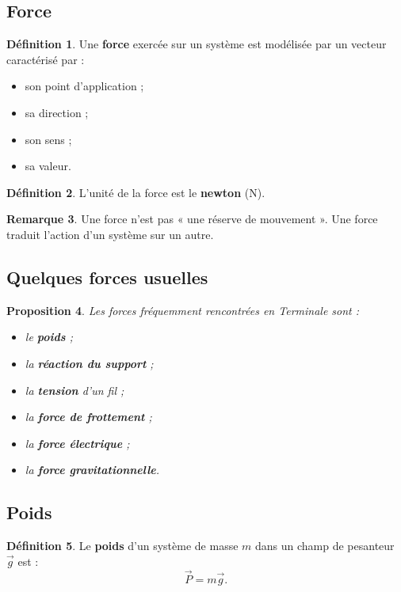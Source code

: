 \documentclass[11pt,a4paper]{article}
\theoremstyle{definition}
\newtheorem{definition}{Définition}[section]
\newtheorem{remarque}[definition]{Remarque}
\theoremstyle{plain}
\newtheorem{proposition}[definition]{Proposition}
\theoremstyle{remark}
\begin{document}
\subsection{Force}

\begin{definition}
Une \textbf{force} exercée sur un système est modélisée par un vecteur caractérisé par :
\begin{itemize}
    \item son point d'application ;
    \item sa direction ;
    \item son sens ;
    \item sa valeur.
\end{itemize}
\end{definition}

\begin{definition}
L'unité de la force est le \textbf{newton} (\si{N}).
\end{definition}

\begin{remarque}
Une force n'est pas « une réserve de mouvement ». Une force traduit l'action d'un système sur un autre.
\end{remarque}

\subsection{Quelques forces usuelles}

\begin{proposition}
Les forces fréquemment rencontrées en Terminale sont :
\begin{itemize}
    \item le \textbf{poids} ;
    \item la \textbf{réaction du support} ;
    \item la \textbf{tension} d'un fil ;
    \item la \textbf{force de frottement} ;
    \item la \textbf{force électrique} ;
    \item la \textbf{force gravitationnelle}.
\end{itemize}
\end{proposition}

\subsection{Poids}

\begin{definition}
Le \textbf{poids} d'un système de masse $m$ dans un champ de pesanteur $\vec{g}$ est :
\[
\vec{P}=m\vec{g}.
\]
\end{definition}
\end{document}
